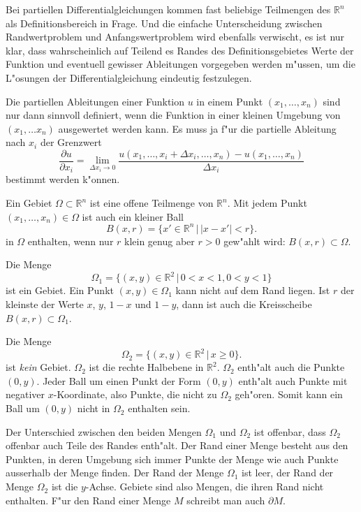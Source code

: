 Bei partiellen Differentialgleichungen kommen fast
beliebige Teilmengen des $\mathbb R^n$ als Definitionsbereich
in Frage. Und die einfache Unterscheidung zwischen Randwertproblem
und Anfangswertproblem wird ebenfalls verwischt, es ist nur klar,
dass wahrscheinlich auf Teilend es Randes des Definitionsgebietes
Werte der Funktion und eventuell gewisser Ableitungen
vorgegeben werden m"ussen, um die L"osungen der Differentialgleichung
eindeutig festzulegen.

Die partiellen Ableitungen einer Funktion $u$
in einem Punkt $(x_1,\dots,x_n)$ 
sind nur dann sinnvoll definiert, wenn die Funktion in einer 
kleinen Umgebung von $(x_1,\dots x_n)$ ausgewertet werden kann.
Es muss ja f"ur die partielle Ableitung nach $x_i$ der Grenzwert
\[
\frac{\partial u}{\partial x_i}=
\lim_{\Delta x_i\to 0}\frac{u(x_1,\dots,x_i+\Delta x_i, \dots ,x_n)-u(x_1,\dots,x_n)}{\Delta x_i}
\]
bestimmt werden k"onnen.

\begin{definition}
Ein Gebiet $\Omega\subset \mathbb R^n$ ist eine offene Teilmenge
von $\mathbb R^n$. Mit jedem Punkt $(x_1,\dots,x_n)\in\Omega$ ist
auch ein kleiner Ball
\[
B(x, r)=\{x'\in\mathbb R^n\,|\,|x-x'|<r\}.
\]
in $\Omega$ enthalten, wenn nur $r$ klein genug aber $r>0$ gew"ahlt wird:
$B(x,r)\subset\Omega$.
\end{definition}

\begin{beispiel}
Die Menge 
\[
\Omega_1=\{ (x,y)\in\mathbb R^2\,|\, 0 < x < 1, 0<y<1\}
\]
ist ein Gebiet. Ein Punkt $(x,y)\in\Omega_1$ kann nicht auf dem
Rand liegen. Ist $r$ der kleinste der Werte $x$, $y$, $1-x$ und $1-y$,
dann ist auch die Kreisscheibe $B(x,r)\subset\Omega_1$.
\end{beispiel}

\begin{beispiel}
Die Menge 
\[
\Omega_2 = \{ (x,y)\in\mathbb R^2\,|\, x\ge 0\}.
\]
ist {\it kein} Gebiet. $\Omega_2$ ist die rechte Halbebene in $\mathbb R^2$.
$\Omega_2$ enth"alt auch die Punkte $(0,y)$. Jeder Ball um einen
Punkt der Form $(0,y)$ enth"alt auch Punkte mit negativer
$x$-Koordinate, also Punkte, die nicht zu $\Omega_2$ geh"oren.
Somit kann ein Ball um $(0,y)$ nicht in $\Omega_2$ enthalten sein.
\end{beispiel}

Der Unterschied zwischen den beiden Mengen $\Omega_1$ und $\Omega_2$
ist offenbar, dass $\Omega_2$ offenbar auch Teile des Randes
enth"alt. Der Rand einer Menge besteht aus den Punkten, in deren
Umgebung sich immer Punkte der Menge wie auch Punkte ausserhalb
der Menge finden. Der Rand der Menge $\Omega_1$ ist leer, der Rand
der Menge $\Omega_2$ ist die $y$-Achse. Gebiete sind also Mengen,
die ihren Rand nicht enthalten. F"ur den Rand einer Menge $M$
schreibt man auch $\partial M$.

